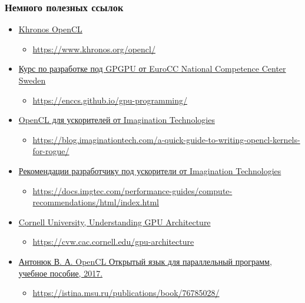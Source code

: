 \documentclass[xcolor=table,aspectratio=169]{beamer}
\begin{document}
\begin{frame}[fragile]
  \frametitle{Немного полезных ссылок}
  \begin{itemize}
    \item \href{https://www.khronos.org/opencl/}{Khronos OpenCL}
    \begin{itemize}
      \item \scriptsize{\url{https://www.khronos.org/opencl/}}
    \end{itemize}
    \item \href{https://enccs.github.io/gpu-programming/}{Курс по разработке под GPGPU от EuroCC National Competence Center Sweden}
    \begin{itemize}
      \item \scriptsize{\url{https://enccs.github.io/gpu-programming/}}
    \end{itemize}
    \item \href{https://blog.imaginationtech.com/a-quick-guide-to-writing-opencl-kernels-for-rogue/}{OpenCL для ускорителей от Imagination Technologies}
    \begin{itemize}
      \item \scriptsize{\url{https://blog.imaginationtech.com/a-quick-guide-to-writing-opencl-kernels-for-rogue/}}
    \end{itemize}
    \item \href{https://docs.imgtec.com/performance-guides/compute-recommendations/html/index.html}{Рекомендации разработчику под ускорители от Imagination Technologies}
    \begin{itemize}
      \item \scriptsize{\url{https://docs.imgtec.com/performance-guides/compute-recommendations/html/index.html}}
    \end{itemize}
    \item \href{https://cvw.cac.cornell.edu/gpu-architecture}{Cornell University, Understanding GPU Architecture}
    \begin{itemize}
      \item \scriptsize{\url{https://cvw.cac.cornell.edu/gpu-architecture}}
    \end{itemize}
    \item \href{https://istina.msu.ru/publications/book/76785028/}{Антонюк В. А. OpenCL Открытый язык для параллельный программ, учебное пособие, 2017.}
    \begin{itemize}
      \item \scriptsize{\url{https://istina.msu.ru/publications/book/76785028/}}
    \end{itemize} 
  \end{itemize}
\end{frame}

\end{document}
